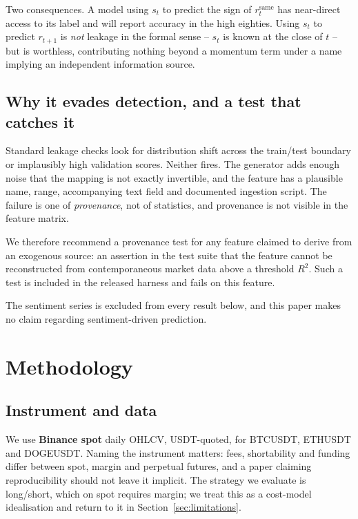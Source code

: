 \documentclass[preprint,12pt,authoryear]{elsarticle}
\begin{document}
Two consequences. A model using $s_t$ to predict the sign of $r^{\text{same}}_t$
has near-direct access to its label and will report accuracy in the high
eighties. Using $s_t$ to predict $r_{t+1}$ is \emph{not} leakage in the formal
sense -- $s_t$ is known at the close of $t$ -- but is worthless, contributing
nothing beyond a momentum term under a name implying an independent information
source.

\subsection{Why it evades detection, and a test that catches it}

Standard leakage checks look for distribution shift across the train/test
boundary or implausibly high validation scores. Neither fires. The generator adds
enough noise that the mapping is not exactly invertible, and the feature has a
plausible name, range, accompanying text field and documented ingestion script.
The failure is one of \emph{provenance}, not of statistics, and provenance is not
visible in the feature matrix.

We therefore recommend a provenance test for any feature claimed to derive from
an exogenous source: an assertion in the test suite that the feature cannot be
reconstructed from contemporaneous market data above a threshold $R^2$. Such a
test is included in the released harness and fails on this feature.

The sentiment series is excluded from every result below, and this paper makes no
claim regarding sentiment-driven prediction.

\section{Methodology}
\label{sec:method}

\subsection{Instrument and data}

We use \textbf{Binance spot} daily OHLCV, USDT-quoted, for BTCUSDT, ETHUSDT and
DOGEUSDT. Naming the instrument matters: fees, shortability and funding differ
between spot, margin and perpetual futures, and a paper claiming reproducibility
should not leave it implicit. The strategy we evaluate is long/short, which on
spot requires margin; we treat this as a cost-model idealisation and return to it
in Section~\ref{sec:limitations}.
\end{document}
